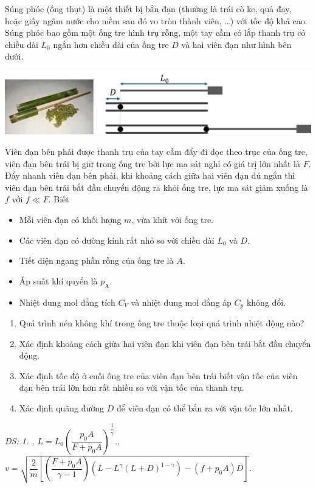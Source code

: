 \begin{ex} 
Súng phóc (ống thụt) là một thiết bị bắn đạn (thường là trái cò ke, quả đay, hoặc giấy ngâm nước cho mềm sau đó vo tròn thành viên, \dots) với tốc độ khá cao. Súng phóc bao gồm một ống tre hình trụ rỗng, một tay cầm có lắp  thanh trụ có chiều dài $L_0$  ngắn hơn chiều dài của ống tre $D$ và hai  viên đạn như hình bên dưới.
\begin{center}
\includegraphics[scale=0.4]{figs/OLP-NHIET-01}
\end{center}
Viên đạn bên phải được thanh trụ của tay cầm đẩy đi dọc theo trục của ống tre, viên đạn bên trái bị giữ trong ống tre bởi lực ma sát nghỉ có giá trị lớn nhất là $F$. Đẩy nhanh viên đạn bên phải, khi khoảng cách giữa hai viên đạn đủ ngắn thì viên đạn bên trái bắt đầu chuyển động ra khỏi ống tre, lực ma sát giảm xuống là $f$ với $f\ll F$. Biết 
\begin{itemize}
	\item Mỗi viên đạn có khối lượng $m$, vừa khít với ống tre.
	\item Các viên đạn có đường kính rất nhỏ so với chiều dài $L_0$ và $D$.
	\item Tiết diện ngang phần rỗng của ống tre là $A$.
	\item Áp suất khí quyển là $p_\mathrm{A}$.
	\item Nhiệt dung mol đẳng tích $C_V$ và nhiệt dung mol đẳng áp $C_p$ không đổi.
\end{itemize}
\begin{enumerate}[label=\arabic*.]
	\item Quá trình nén không khí trong ống tre thuộc loại quá trình nhiệt động nào?
	\item Xác định khoảng cách giữa hai viên đạn khi viên đạn bên trái bắt đầu chuyển động.
	\item Xác định tốc độ ở cuối ống tre của viên đạn bên trái biết vận tốc của viên đạn bên trái lớn hơn rất nhiều so với vận tốc của thanh trụ.
	\item Xác định quãng đường $D$ để viên đạn có thể bắn ra với vận tốc lớn nhất.
\end{enumerate}

\hspace*{0pt}\hfill\textit{ĐS: 1. \smiley{}. $L=L_0\left(\dfrac{p_0A}{F+p_0A}\right)^{\dfrac{1}{\gamma}}$.. $v=\sqrt{\dfrac{2}{m}\left[\left(\dfrac{F+p_0A}{\gamma-1}\right)\left(L-L^\gamma\left(L+D\right)^{1-\gamma}\right)-\left(f+p_0A\right)D\right]}$.
}
 	\loigiai{
		
	}
\end{ex}
